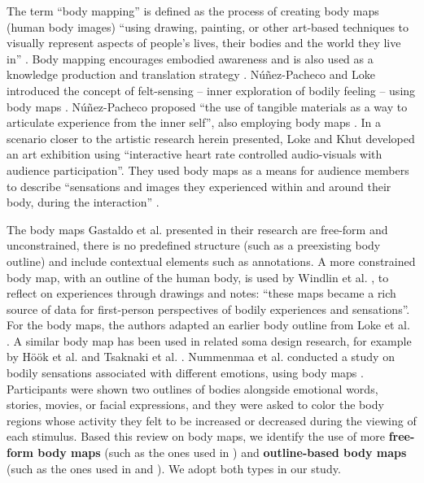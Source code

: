The term “body mapping” is defined as the process of creating body maps (human body images) “using drawing, painting, or other art-based techniques to visually represent aspects of people's lives, their bodies and the world they live in” \cite{gastaldo_body-map_2012}. Body mapping encourages embodied awareness and is also used as a knowledge production and translation strategy \cite{jager_embodied_2016}. Núñez-Pacheco and Loke introduced the concept of felt-sensing -- inner exploration of bodily feeling -- using body maps \cite{nunez-pacheco_felt-sensing_2016}. Núñez-Pacheco proposed “the use of tangible materials as a way to articulate experience from the inner self”, also employing body maps \cite{nunez-pacheco_tangible_2021}. In a scenario closer to the artistic research herein presented, Loke and Khut \cite{loke_intimate_2014} developed an art exhibition using “interactive heart rate controlled audio-visuals with audience participation”. They used body maps as a means for audience members to describe “sensations and images they experienced within and around their body, during the interaction” \cite{loke_intimate_2014}.

The body maps Gastaldo et al. presented in their research are free-form and unconstrained, there is no predefined structure (such as a preexisting body outline) and include contextual elements such as annotations. A more constrained body map, with an outline of the human body, is used by Windlin et al. \cite{windlin_soma_2019}, to reflect on experiences through drawings and notes: “these maps became a rich source of data for first-person perspectives of bodily experiences and sensations”. For the body maps, the authors adapted an earlier body outline from Loke et al. \cite{loke_bodily_2012}. A similar body map has been used in related soma design research, for example by Höök et al. \cite{hook_soma_2019} and Tsaknaki et al. \cite{tsaknaki_teaching_2019}. Nummenmaa et al. conducted a study on bodily sensations associated with different emotions, using body maps \cite{nummenmaa_bodily_2014}. Participants were shown two outlines of bodies alongside emotional words, stories, movies, or facial expressions, and they were asked to color the body regions whose activity they felt to be increased or decreased during the viewing of each stimulus. Based this review on body maps, we identify the use of more \textbf{free-form body maps} (such as the ones used in \cite{gastaldo_body-map_2012}) and \textbf{outline-based body maps} (such as the ones used in \cite{windlin_soma_2019} and \cite{nummenmaa_bodily_2014}). We adopt both types in our study.

